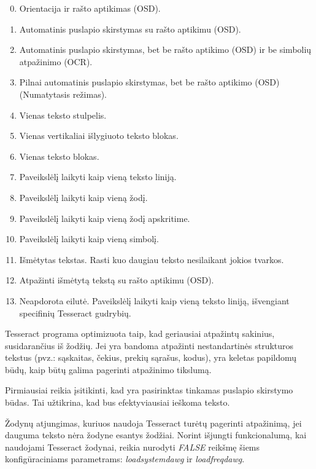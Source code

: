 \documentclass{VUMIFInfBakalaurinis}
\begin{document}
\begin{enumerate}
  \setcounter{enumi}{-1}
  \item Orientacija ir rašto aptikimas (OSD).
  \item Automatinis puslapio skirstymas su rašto aptikimu (OSD).
  \item Automatinis puslapio skirstymas, bet be rašto aptikimo (OSD) ir be simbolių atpažinimo (OCR).
  \item Pilnai automatinis puslapio skirstymas, bet be rašto aptikimo (OSD) (Numatytasis režimas).
  \item Vienas teksto stulpelis.
  \item Vienas vertikaliai išlygiuoto teksto blokas.
  \item Vienas teksto blokas.
  \item Paveikslėlį laikyti kaip vieną teksto liniją.
  \item Paveikslėlį laikyti kaip vieną žodį.
  \item Paveikslėlį laikyti kaip vieną žodį apskritime.
  \item Paveikslėlį laikyti kaip vieną simbolį.
  \item Išmėtytas tekstas. Rasti kuo daugiau teksto nesilaikant jokios tvarkos.
  \item Atpažinti išmėtytą tekstą su rašto aptikimu (OSD).
  \item Neapdorota eilutė. Paveikslėlį laikyti kaip vieną teksto liniją, išvengiant specifinių Tesseract gudrybių.
\end{enumerate}

Tesseract programa optimizuota taip, kad geriausiai atpažintų sakinius, susidarančius iš žodžių. 
Jei yra bandoma atpažinti nestandartinės strukturos tekstus (pvz.: sąskaitas, čekius, prekių sąrašus, kodus), yra keletas papildomų 
būdų, kaip būtų galima pagerinti atpažinimo tikslumą.

Pirmiausiai reikia įsitikinti, kad yra pasirinktas tinkamas puslapio skirstymo būdas. Tai užtikrina, kad bus efektyviausiai ieškoma teksto.

Žodynų atjungimas, kuriuos naudoja Tesseract turėtų pagerinti atpažinimą, jei dauguma teksto nėra žodyne esantys žodžiai.
Norint išjungti funkcionalumą, kai naudojami Tesseract žodynai, reikia nurodyti \textit{FALSE} reikšmę šiems konfigūraciniams parametrams:
\textit{load\textunderscore system\textunderscore dawg} ir \textit{load\textunderscore freq\textunderscore dawg}.
\end{document}
